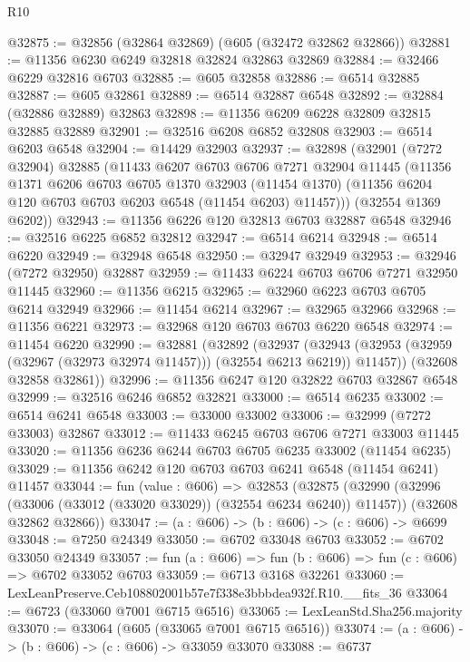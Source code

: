 \begin{lexlean}{R10}
\begin{coremodule}
@32875 := @32856 (@32864 @32869) (@605 (@32472 @32862 @32866))
@32881 := @11356 @6230 @6249 @32818 @32824 @32863 @32869
@32884 := @32466 @6229 @32816 @6703
@32885 := @605 @32858
@32886 := @6514 @32885
@32887 := @605 @32861
@32889 := @6514 @32887 @6548
@32892 := @32884 (@32886 @32889) @32863
@32898 := @11356 @6209 @6228 @32809 @32815 @32885 @32889
@32901 := @32516 @6208 @6852 @32808
@32903 := @6514 @6203 @6548
@32904 := @14429 @32903
@32937 := @32898
    (@32901
      (@7272 @32904)
      @32885
      (@11433
        @6207
        @6703
        @6706
        @7271
        @32904
        @11445
        (@11356
          @1371
          @6206
          @6703
          @6705
          @1370
          @32903
          (@11454 @1370)
          (@11356 @6204 @120 @6703 @6703 @6203 @6548 (@11454 @6203) @11457)))
      (@32554 @1369 @6202))
@32943 := @11356 @6226 @120 @32813 @6703 @32887 @6548
@32946 := @32516 @6225 @6852 @32812
@32947 := @6514 @6214
@32948 := @6514 @6220
@32949 := @32948 @6548
@32950 := @32947 @32949
@32953 := @32946 (@7272 @32950) @32887
@32959 := @11433 @6224 @6703 @6706 @7271 @32950 @11445
@32960 := @11356 @6215
@32965 := @32960 @6223 @6703 @6705 @6214 @32949
@32966 := @11454 @6214
@32967 := @32965 @32966
@32968 := @11356 @6221
@32973 := @32968 @120 @6703 @6703 @6220 @6548
@32974 := @11454 @6220
@32990 := @32881
    (@32892
      (@32937
        (@32943 (@32953 (@32959 (@32967 (@32973 @32974 @11457))) (@32554 @6213 @6219)) @11457))
      (@32608 @32858 @32861))
@32996 := @11356 @6247 @120 @32822 @6703 @32867 @6548
@32999 := @32516 @6246 @6852 @32821
@33000 := @6514 @6235
@33002 := @6514 @6241 @6548
@33003 := @33000 @33002
@33006 := @32999 (@7272 @33003) @32867
@33012 := @11433 @6245 @6703 @6706 @7271 @33003 @11445
@33020 := @11356 @6236 @6244 @6703 @6705 @6235 @33002 (@11454 @6235)
@33029 := @11356 @6242 @120 @6703 @6703 @6241 @6548 (@11454 @6241) @11457
@33044 := fun (value : @606) =>
  @32853
    (@32875
      (@32990 (@32996 (@33006 (@33012 (@33020 @33029)) (@32554 @6234 @6240)) @11457))
      (@32608 @32862 @32866))
@33047 := (a : @606) -> (b : @606) -> (c : @606) -> @6699
@33048 := @7250 @24349
@33050 := @6702 @33048 @6703
@33052 := @6702 @33050 @24349
@33057 := fun (a : @606) => fun (b : @606) => fun (c : @606) => @6702 @33052 @6703
@33059 := @6713 @3168 @32261
@33060 := LexLeanPreserve.Ceb108802001b57e7f338e3bbbdea932f.R10.__fits_36
@33064 := @6723 (@33060 @7001 @6715 @6516)
@33065 := LexLeanStd.Sha256.majority
@33070 := @33064 (@605 (@33065 @7001 @6715 @6516))
@33074 := (a : @606) -> (b : @606) -> (c : @606) -> @33059 @33070
@33088 := @6737

\end{coremodule}
\end{lexlean}
